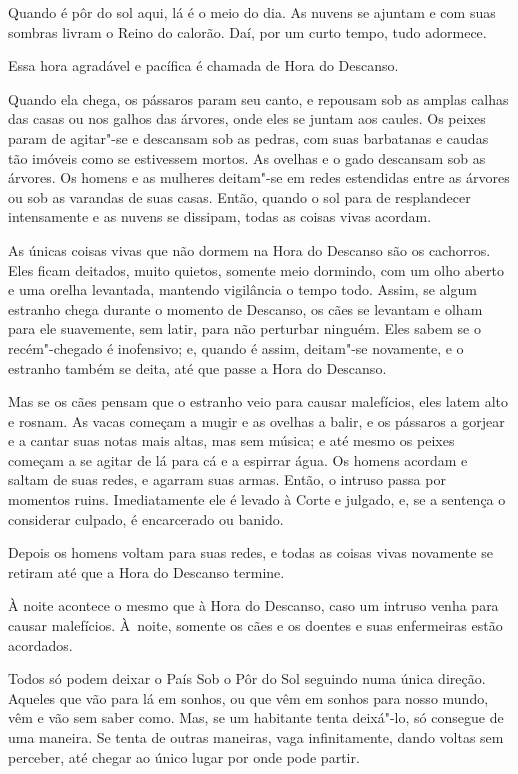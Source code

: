 Quando é pôr do sol aqui, lá é o meio do dia. As nuvens se ajuntam e com
suas sombras livram o Reino do calorão. Daí, por um curto tempo, tudo
adormece.

Essa hora agradável e pacífica é chamada de Hora do Descanso.

Quando ela chega, os pássaros param seu canto, e repousam sob as amplas
calhas das casas ou nos galhos das árvores, onde eles se juntam aos
caules. Os peixes param de agitar"-se e descansam sob as pedras, com suas
barbatanas e caudas tão imóveis como se estivessem mortos. As ovelhas e
o gado descansam sob as árvores. Os homens e as mulheres deitam"-se em
redes estendidas entre as árvores ou sob as varandas de suas casas.
Então, quando o sol para de resplandecer intensamente e as nuvens se
dissipam, todas as coisas vivas acordam.

As únicas coisas vivas que não dormem na Hora do Descanso são os
cachorros. Eles ficam deitados, muito quietos, somente meio dormindo,
com um olho aberto e uma orelha levantada, mantendo vigilância o tempo
todo. Assim, se algum estranho chega durante o momento de Descanso, os
cães se levantam e olham para ele suavemente, sem latir, para não
perturbar ninguém. Eles sabem se o recém"-chegado é inofensivo; e, quando
é assim, deitam"-se novamente, e o estranho também se deita, até que
passe a Hora do Descanso.

Mas se os cães pensam que o estranho veio para causar malefícios, eles
latem alto e rosnam. As vacas começam a mugir e as ovelhas a balir, e os
pássaros a gorjear e a cantar suas notas mais altas, mas sem música; e
até mesmo os peixes começam a se agitar de lá para cá e a espirrar água.
Os homens acordam e saltam de suas redes, e agarram suas armas. Então, o
intruso passa por momentos ruins. Imediatamente ele é levado à Corte e
julgado, e, se a sentença o considerar culpado, é encarcerado ou banido.

Depois os homens voltam para suas redes, e todas as coisas vivas
novamente se retiram até que a Hora do Descanso termine.

À noite acontece o mesmo que à Hora do Descanso, caso um intruso venha
para causar malefícios. À~noite, somente os cães e os doentes e suas
enfermeiras estão acordados.

Todos só podem deixar o País Sob o Pôr do Sol seguindo numa única
direção. Aqueles que vão para lá em sonhos, ou que vêm em sonhos para
nosso mundo, vêm e vão sem saber como. Mas, se um habitante tenta
deixá"-lo, só consegue de uma maneira. Se tenta de outras maneiras, vaga
infinitamente, dando voltas sem perceber, até chegar ao único lugar por
onde pode partir.

